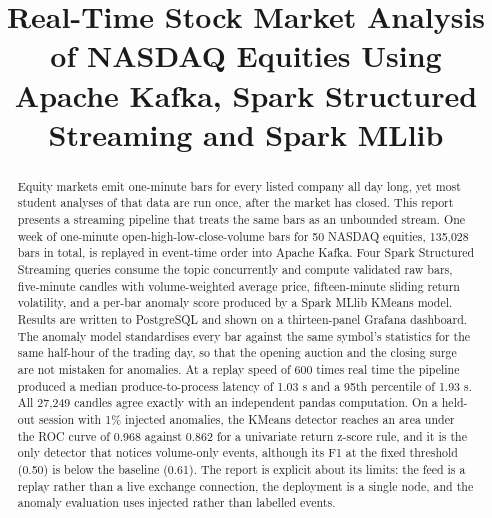 \documentclass[conference]{IEEEtran}
\begin{document}
\title{Real-Time Stock Market Analysis of NASDAQ Equities Using Apache Kafka, Spark Structured Streaming and Spark MLlib}

\author{
\and
{}
}

\maketitle

\begin{abstract}
Equity markets emit one-minute bars for every listed company all day long, yet most student analyses of that data are run once, after the market has closed. This report presents a streaming pipeline that treats the same bars as an unbounded stream. One week of one-minute open-high-low-close-volume bars for 50 NASDAQ equities, 135,028 bars in total, is replayed in event-time order into Apache Kafka. Four Spark Structured Streaming queries consume the topic concurrently and compute validated raw bars, five-minute candles with volume-weighted average price, fifteen-minute sliding return volatility, and a per-bar anomaly score produced by a Spark MLlib KMeans model. Results are written to PostgreSQL and shown on a thirteen-panel Grafana dashboard. The anomaly model standardises every bar against the same symbol's statistics for the same half-hour of the trading day, so that the opening auction and the closing surge are not mistaken for anomalies. At a replay speed of 600 times real time the pipeline produced a median produce-to-process latency of 1.03 s and a 95th percentile of 1.93 s. All 27,249 candles agree exactly with an independent pandas computation. On a held-out session with 1\% injected anomalies, the KMeans detector reaches an area under the ROC curve of 0.968 against 0.862 for a univariate return z-score rule, and it is the only detector that notices volume-only events, although its F1 at the fixed threshold (0.50) is below the baseline (0.61). The report is explicit about its limits: the feed is a replay rather than a live exchange connection, the deployment is a single node, and the anomaly evaluation uses injected rather than labelled events.
\end{abstract}
\end{document}

